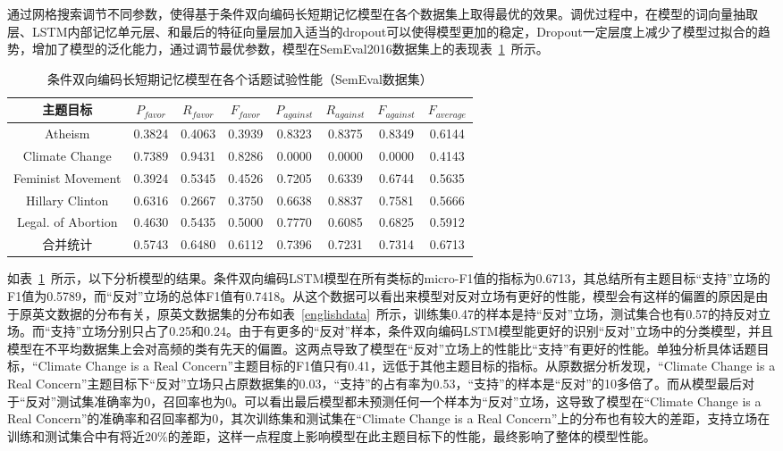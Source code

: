 通过网格搜索调节不同参数，使得基于条件双向编码长短期记忆模型在各个数据集上取得最优的效果。调优过程中，在模型的词向量抽取层、LSTM内部记忆单元层、和最后的特征向量层加入适当的dropout可以使得模型更加的稳定，Dropout一定层度上减少了模型过拟合的趋势，增加了模型的泛化能力，通过调节最优参数，模型在SemEval2016数据集上的表现表~\ref{conditional_semeval}~所示。
\begin{table}[htbp]
	\caption[table123]{条件双向编码长短期记忆模型在各个话题试验性能（SemEval数据集）}
	\label{conditional_semeval}
	\vspace{0.5em}\centering\wuhao
	\begin{tabular}{cccccccc}
		\toprule[1.5pt]
		主题目标& $P_{favor}$&$R_{favor}$&$F_{favor}$&$P_{against}$&$R_{against}$&$F_{against}$&$F_{average}$ \\
		\midrule[1pt]
		Atheism&0.3824&0.4063&0.3939&0.8323&0.8375&0.8349&0.6144\\
		Climate Change&0.7389&0.9431&0.8286&0.0000&0.0000&0.0000&0.4143\\
		Feminist Movement&0.3924&0.5345&0.4526&0.7205&0.6339&0.6744&0.5635\\
		Hillary Clinton&0.6316&0.2667&0.3750&0.6638&0.8837&0.7581&0.5666\\
		Legal. of Abortion&0.4630&0.5435&0.5000&0.7770&0.6085&0.6825&0.5912\\
		合并统计&0.5743&0.6480&0.6112&0.7396&0.7231&0.7314&0.6713\\
		\bottomrule[1.5pt]
	\end{tabular}
\end{table}

如表~\ref{conditional_semeval}~所示，以下分析模型的结果。条件双向编码LSTM模型在所有类标的micro-F1值的指标为0.6713，其总结所有主题目标“支持”立场的F1值为0.5789，而“反对”立场的总体F1值有0.7418。从这个数据可以看出来模型对反对立场有更好的性能，模型会有这样的偏置的原因是由于原英文数据的分布有关，原英文数据集的分布如表~\ref{englishdata}~所示，训练集0.47的样本是持“反对”立场，测试集合也有0.57的持反对立场。而“支持”立场分别只占了0.25和0.24。由于有更多的“反对”样本，条件双向编码LSTM模型能更好的识别“反对”立场中的分类模型，并且模型在不平均数据集上会对高频的类有先天的偏置。这两点导致了模型在“反对”立场上的性能比“支持”有更好的性能。单独分析具体话题目标，“Climate Change is a Real Concern”主题目标的F1值只有0.41，远低于其他主题目标的指标。从原数据分析发现，“Climate Change is a Real Concern”主题目标下“反对”立场只占原数据集的0.03，“支持”的占有率为0.53，“支持”的样本是“反对”的10多倍了。而从模型最后对于“反对”测试集准确率为0，召回率也为0。可以看出最后模型都未预测任何一个样本为“反对”立场，这导致了模型在“Climate Change is a Real Concern”的准确率和召回率都为0，其次训练集和测试集在“Climate Change is a Real Concern”上的分布也有较大的差距，支持立场在训练和测试集合中有将近20\%的差距，这样一点程度上影响模型在此主题目标下的性能，最终影响了整体的模型性能。

